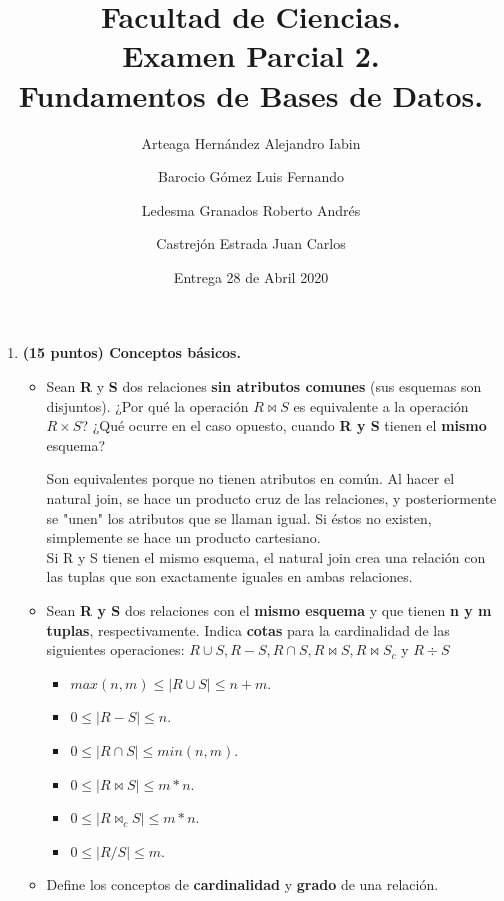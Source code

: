 \documentclass{article}
\title{Facultad de Ciencias. \\Examen Parcial 2. \\ Fundamentos de Bases de             Datos.}
\author{Arteaga Hernández Alejandro Iabin \and 
        Barocio Gómez Luis Fernando \and 
        Ledesma Granados Roberto Andrés \and
        Castrejón Estrada Juan Carlos}
\date{Entrega 28 de Abril 2020}
\begin{document}
\maketitle

\begin{enumerate}

    \item \textbf{(15 puntos) Conceptos básicos.}
    
    \begin{itemize}
        \item Sean \textbf{R} y \textbf{S} dos relaciones \textbf{sin atributos comunes} (sus esquemas son disjuntos). ¿Por qué la operación \textbf{$R \bowtie S$} es equivalente a la operación \textbf{$R \times S$}? ¿Qué ocurre en el caso opuesto, cuando \textbf{R y S} tienen el \textbf{mismo} esquema?
    
        
        Son equivalentes porque no tienen atributos en común. Al hacer el natural join, se hace un producto cruz de las relaciones, y posteriormente se "unen" los atributos que se llaman igual. Si éstos no existen, simplemente se hace un producto cartesiano.\\ Si R y S tienen el mismo esquema, el natural join crea una relación con las tuplas que son exactamente iguales en ambas relaciones.
        
        \item Sean \textbf{R y S} dos relaciones con el \textbf{mismo esquema} y que tienen \textbf{n y m tuplas}, respectivamente. Indica \textbf{cotas} para la cardinalidad de las siguientes operaciones: $R \cup S, R - S, R \cap S, R \bowtie S, R \bowtie S_c $ y $R \div S$
        \begin{itemize}
           \item $max(n, m) \leq |R\cup S| \leq n+m$.
           \item $0 \leq |R-S| \leq n$.
           \item $0 \leq |R\cap S| \leq min(n, m)$.
           \item $0 \leq |R\bowtie S| \leq m*n$.
           \item $0 \leq |R\bowtie _c S| \leq m*n$.
           \item $0 \leq |R / S| \leq m$.
       \end{itemize}
        
        \item Define los conceptos de \textbf{cardinalidad} y \textbf{grado} de una relación.
        

\end{itemize}
\end{enumerate}
\end{document}
